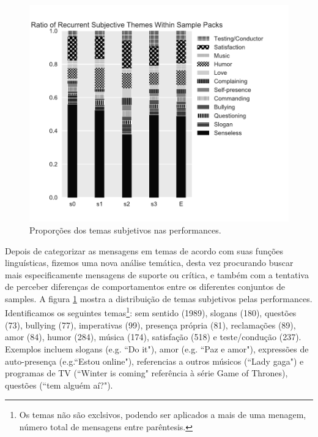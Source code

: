 \begin{figure}
\includegraphics[width=1\linewidth]{pictures/cap3/ratios_bw}
\caption{Proporções dos temas subjetivos nas performances.}
\label{subj}
\end{figure}



Depois de categorizar as mensagens em temas de acordo com suas funções linguísticas, fizemos uma nova análise temática, desta vez procurando buscar mais especificamente mensagens de suporte ou crítica, e também com a tentativa de perceber diferenças de comportamentos entre os diferentes conjuntos de samples. A figura \ref{subj} mostra a distribuição de temas subjetivos pelas performances. Identificamos os seguintes temas\footnote{Os temas não são exclsivos, podendo ser aplicados a mais de uma menagem, número total de mensagens entre parêntesis.}: sem sentido (1989), slogans (180), questões (73), bullying (77), imperativas (99), presença própria (81), reclamações (89), amor (84), humor (284), música (174), satisfação (518) e teste/condução (237). Exemplos incluem slogans (e.g. ``Do it"), amor (e.g. ``Paz e amor"), expressões de auto-presença (e.g.``Estou online"), referencias a outros músicos (``Lady gaga") e programas de TV (``Winter is coming" referência à série Game of Thrones), questões (``tem alguém aí?"). 

